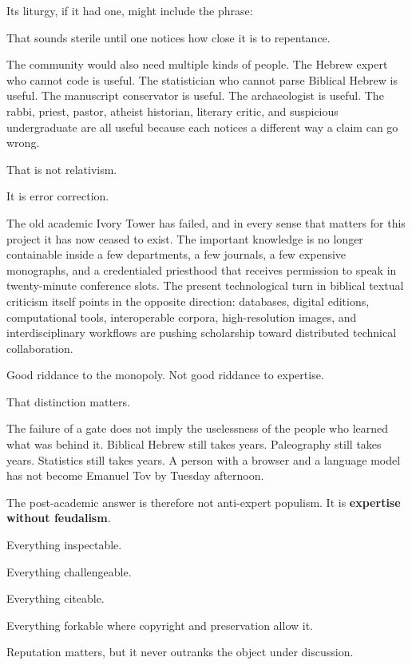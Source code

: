 Its liturgy, if it had one, might include the phrase:


That sounds sterile until one notices how close it is to repentance.

The community would also need multiple kinds of people. The Hebrew expert who cannot code is useful. The statistician who cannot parse Biblical Hebrew is useful. The manuscript conservator is useful. The archaeologist is useful. The rabbi, priest, pastor, atheist historian, literary critic, and suspicious undergraduate are all useful because each notices a different way a claim can go wrong.

That is not relativism.

It is error correction.

The old academic Ivory Tower has failed, and in every sense that matters for this project it has now ceased to exist. The important knowledge is no longer containable inside a few departments, a few journals, a few expensive monographs, and a credentialed priesthood that receives permission to speak in twenty-minute conference slots. The present technological turn in biblical textual criticism itself points in the opposite direction: databases, digital editions, computational tools, interoperable corpora, high-resolution images, and interdisciplinary workflows are pushing scholarship toward distributed technical collaboration.\cite{Longacre2025,ETCBC}

Good riddance to the monopoly. Not good riddance to expertise.

That distinction matters.

The failure of a gate does not imply the uselessness of the people who learned what was behind it. Biblical Hebrew still takes years. Paleography still takes years. Statistics still takes years. A person with a browser and a language model has not become Emanuel Tov by Tuesday afternoon.

The post-academic answer is therefore not anti-expert populism. It is \textbf{expertise without feudalism}.

Everything inspectable.

Everything challengeable.

Everything citeable.

Everything forkable where copyright and preservation allow it.

Reputation matters, but it never outranks the object under discussion.

